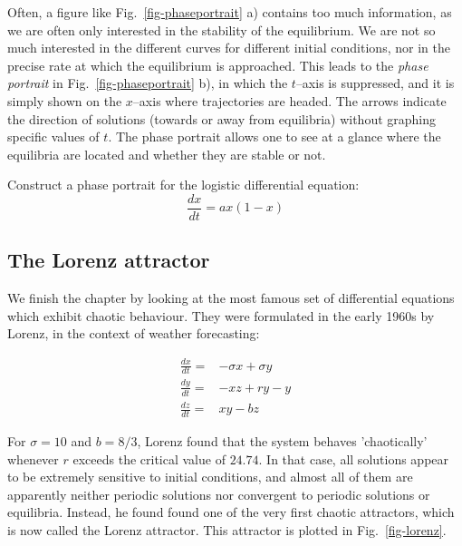 Often, a figure like Fig.~\ref{fig-phaseportrait}  a) contains too much information, as we are often only interested in the stability of the equilibrium. We are not so much interested in the different curves for different initial conditions, nor in the precise rate at which the equilibrium is approached. This leads to the \emph{phase portrait} in Fig.~\ref{fig-phaseportrait} b), in which the $t$--axis is suppressed, and it is simply shown on the $x$--axis where trajectories are headed. The arrows indicate the direction of solutions (towards or away from equilibria) without graphing specific values of $t$. The phase portrait allows one to see at a glance where the equilibria are located and whether they are stable or not.

\begin{sidebar}
\begin{ex}
Construct a phase portrait for the logistic differential equation:
$$\frac{dx}{dt} = a x (1-x)$$
\end{ex}
\end{sidebar}

\subsection{The Lorenz attractor}

We finish the chapter by looking at the most famous set of differential equations which exhibit chaotic behaviour. They were formulated in the early 1960s by Lorenz, in the context of weather forecasting:

\begin{align}
\frac{dx}{dt} =& -\sigma x + \sigma y \\
\frac{dy}{dt} =& -xz + r y - y \\
\frac{dz}{dt} =& xy - bz
\end{align} 

For $\sigma=10$ and $b=8/3$, Lorenz found that the system behaves 'chaotically' whenever $r$ exceeds the critical value of $24.74$. In that case, all solutions appear to be extremely sensitive to initial conditions, and almost all of them are apparently neither periodic solutions nor convergent to periodic solutions or equilibria. Instead, he found found one of the very first chaotic attractors, which is now called the Lorenz attractor. This attractor is plotted in Fig.~\ref{fig-lorenz}.

